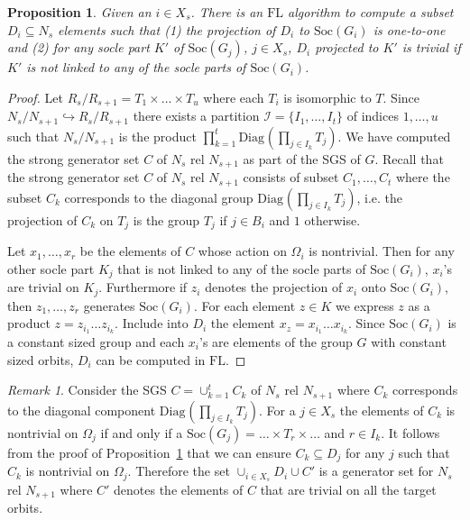\documentclass[11pt]{madras}%
\newtheorem{proposition}[theorem]{Proposition}
\theoremstyle{remark}
\newtheorem{remark}[theorem]{Remark}
\newcommand{\Soc}[1]{{\ensuremath{\mathrm{Soc}\left(#1\right)}}}
\newcommand{\Diag}[2][]{{\ensuremath{\mathrm{Diag}_{{#1}}\left(#2\right)}}}
\newcommand{\bigtimes}{\prod}
\begin{document}
\begin{proposition}\label{prop-compute-Di}
  Given an $i \in X_s$.  There is an $\mathrm{FL}$ algorithm to
  compute a subset $D_i \subseteq N_s$ elements such that (1) the
  projection of $D_i$ to $\Soc{G_i}$ is one-to-one and (2) for any
  socle part $K'$ of $\Soc{G_j}$, $j \in X_s$, $D_i$ projected to $K'$
  is trivial if $K'$ is not linked to any of the socle parts of
  $\Soc{G_i}$.
\end{proposition}
\begin{proof}

  Let $R_s/R_{s+1} = T_1\times \ldots \times T_u$ where each $T_i$ is
  isomorphic to $T$. Since $N_s/N_{s+1} \hookrightarrow R_s/R_{s+1}$
  there exists a partition $\mathcal{I} = \{I_1,\ldots,I_t \}$ of
  indices $1,\ldots,u$ such that $N_s/N_{s+1}$ is the product
  $\prod_{k=1}^{t} \Diag{\bigtimes_{j \in I_k} T_j}$.  We have
  computed the strong generator set $C$ of $N_s$ rel $N_{s+1}$ as part
  of the SGS of $G$.  Recall that the strong generator set $C$ of
  $N_s$ rel $N_{s+1}$ consists of subset $C_1,\ldots,C_{t}$ where the
  subset $C_k$ corresponds to the diagonal group $\Diag{\bigtimes_{j
      \in I_k} T_j}$, i.e. the projection of $C_k$ on $T_j$ is the
  group $T_j$ if $j \in B_i$ and $1$ otherwise.

  Let $x_1,\ldots,x_r$ be the elements of $C$ whose action on
  $\Omega_i$ is nontrivial.  Then for any other socle part $K_j$ that
  is not linked to any of the socle parts of $\Soc{G_i}$, $x_i$'s are
  trivial on $K_j$. Furthermore if $z_i$ denotes the projection of
  $x_i$ onto $\Soc{G_i}$, then $z_1,\ldots,z_r$ generates $\Soc{G_i}$.
  For each element $z \in K$ we express $z$ as a product $z =
  z_{i_1}\ldots z_{i_k}$. Include into $D_i$ the element $x_z =
  x_{i_1}\ldots x_{i_k}$. Since $\Soc{G_i}$ is a constant sized group
  and each $x_i$'s are elements of the group $G$ with constant sized
  orbits, $D_i$ can be computed in $\mathrm{FL}$.

\end{proof}

\begin{remark}\label{rem-Di-generate}
  Consider the SGS $C = \cup_{k=1}^t C_k$ of $N_s$ rel $N_{s+1}$ where
  $C_k$ corresponds to the diagonal component $\Diag{\bigtimes_{j \in
      I_k} T_j}$. For a $j \in X_s$ the elements of $C_k$ is
  nontrivial on $\Omega_j$ if and only if a $\Soc{G_j} = \ldots \times
  T_{r} \times \ldots$ and $r \in I_k$. It follows from the proof of
  Proposition~\ref{prop-compute-Di} that we can ensure $C_k \subseteq
  D_j$ for any $j$ such that $C_k$ is nontrivial on $\Omega_j$.
  Therefore the set $\cup_{i \in X_s }D_i \cup C'$ is a generator set
  for $N_s$ rel $N_{s+1}$ where $C'$ denotes the elements of $C$ that
  are trivial on all the target orbits.
\end{remark}
\end{document}
